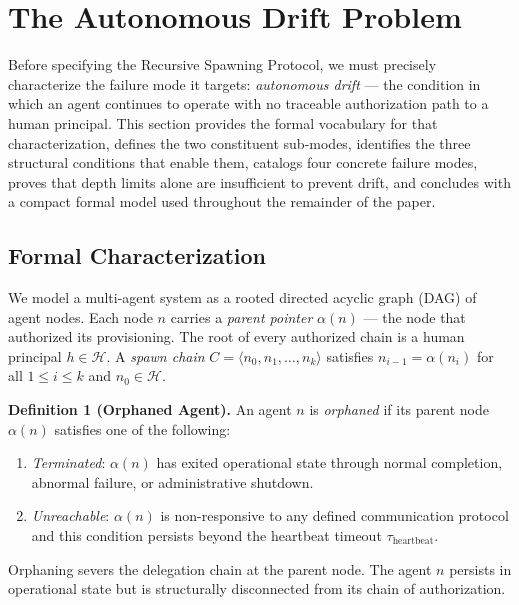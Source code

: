 \section{The Autonomous Drift Problem}
\label{sec:rs-drift}

Before specifying the Recursive Spawning Protocol, we must precisely characterize the failure mode it targets: \emph{autonomous drift} — the condition in which an agent continues to operate with no traceable authorization path to a human principal. This section provides the formal vocabulary for that characterization, defines the two constituent sub-modes, identifies the three structural conditions that enable them, catalogs four concrete failure modes, proves that depth limits alone are insufficient to prevent drift, and concludes with a compact formal model used throughout the remainder of the paper.

\subsection{Formal Characterization}
\label{sec:rs-drift-formal}

We model a multi-agent system as a rooted directed acyclic graph (DAG) of agent nodes. Each node $n$ carries a \emph{parent pointer} $\alpha(n)$ — the node that authorized its provisioning. The root of every authorized chain is a human principal $h \in \mathcal{H}$. A \emph{spawn chain} $C = \langle n_0, n_1, \ldots, n_k \rangle$ satisfies $n_{i-1} = \alpha(n_i)$ for all $1 \leq i \leq k$ and $n_0 \in \mathcal{H}$.

\medskip
\noindent\textbf{Definition 1 (Orphaned Agent).}
An agent $n$ is \emph{orphaned} if its parent node $\alpha(n)$ satisfies one of the following:
\begin{enumerate}
  \item[(a)] \emph{Terminated}: $\alpha(n)$ has exited operational state through normal completion, abnormal failure, or administrative shutdown.
  \item[(b)] \emph{Unreachable}: $\alpha(n)$ is non-responsive to any defined communication protocol and this condition persists beyond the heartbeat timeout $\tau_{\mathrm{heartbeat}}$.
\end{enumerate}
Orphaning severs the delegation chain at the parent node. The agent $n$ persists in operational state but is structurally disconnected from its chain of authorization.

